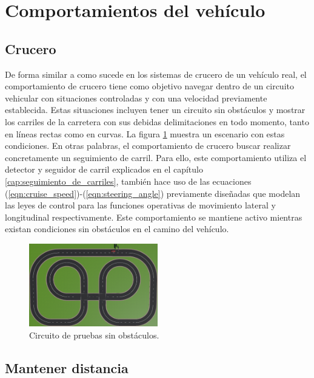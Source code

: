 \section{Comportamientos del vehículo} \label{sec:comportamientos_del_vehículo}

\subsection{Crucero} \label{sub:crucero}

De forma similar a como sucede en los sistemas de crucero de un vehículo real, el comportamiento de crucero tiene como objetivo navegar dentro de un circuito vehicular con situaciones controladas y con una velocidad previamente establecida. Estas situaciones incluyen tener un circuito sin obstáculos y mostrar los carriles de la carretera con sus debidas delimitaciones en todo momento, tanto en líneas rectas como en curvas. La figura \ref{fig:cruise_behavior} muestra un escenario con estas condiciones. En otras palabras, el comportamiento de crucero buscar realizar concretamente un seguimiento de carril. Para ello, este comportamiento utiliza el detector y seguidor de carril explicados en el capítulo \ref{cap:seguimiento_de_carriles}, también hace uso de las ecuaciones (\ref{eqn:cruise_speed})-(\ref{eqn:steering_angle}) previamente diseñadas que modelan las leyes de control para las funciones operativas de movimiento lateral y longitudinal respectivamente. Este comportamiento se mantiene activo mientras existan condiciones sin obstáculos en el camino del vehículo.
\begin{figure}[h]
    \centering
    \includegraphics[width=0.5\textwidth]{Figures/Figures_Cap06/crucero.png}
    \caption{Circuito de pruebas sin obstáculos.}
    \label{fig:cruise_behavior}
\end{figure}

\subsection{Mantener distancia} \label{sub:mantener_distancia}

